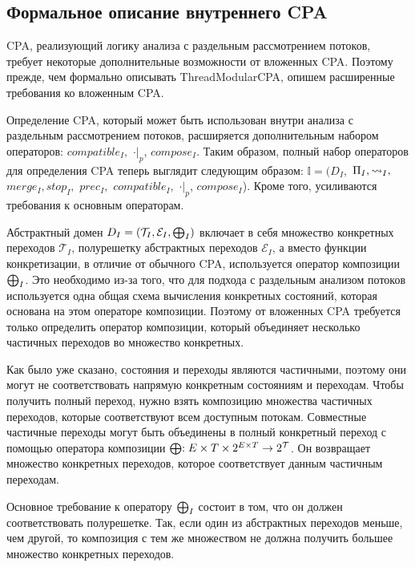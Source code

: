 \subsection{Формальное описание внутреннего CPA}
 
CPA, реализующий логику анализа с раздельным рассмотрением потоков, требует некоторые дополнительные возможности от вложенных CPA. 
Поэтому прежде, чем формально описывать ThreadModularCPA, опишем расширенные требования ко вложенным CPA.
 
Определение CPA, который может быть использован внутри анализа с раздельным рассмотрением потоков, расширяется дополнительным набором операторов: $compatible_{I},$ $\cdot|_p$, $compose_I$.
Таким образом, полный набор операторов для определения CPA теперь выглядит следующим образом: $\mathbb{I}=(D_{I},$ $\Pi_{I}, \leadsto_{I},$ $merge_{I}, stop_{I},$ $prec_{I},$ $compatible_{I},$ $\cdot|_p$, $compose_I$).
Кроме того, усиливаются требования к основным операторам.

Абстрактный домен $D_I = (\mathcal{T}_I, \mathcal{E}_I, \mathrel{\bigoplus}_I)$ включает в себя множество конкретных переходов $\mathcal{T}_I$, полурешетку абстрактных переходов $\mathcal{E}_I$, а вместо функции конкретизации, в отличие от обычного CPA, используется оператор композиции $\mathrel{\bigoplus}_I$.
Это необходимо из-за того, что для подхода с раздельным анализом потоков используется одна общая схема вычисления конкретных состояний, которая основана на этом операторе композиции. 
Поэтому от вложенных CPA требуется только определить оператор композиции, который объединяет несколько частичных переходов во множество конкретных.

Как было уже сказано, состояния и переходы являются частичными, поэтому они могут не соответствовать напрямую конкретным состояниям и переходам. Чтобы получить полный переход, нужно взять композицию множества частичных переходов, которые соответствуют всем доступным потокам. Совместные частичные переходы могут быть объединены в полный конкретный переход с помощью оператора композиции $\mathrel{\bigoplus}: E \times T \times 2^{E \times T} \to 2^{\mathcal{T}}$.
Он возвращает множество конкретных переходов, которое соответствует данным частичным переходам.

Основное требование к оператору $\mathrel{\bigoplus}_I$ состоит в том, что он должен соответствовать полурешетке. Так, если один из абстрактных переходов меньше, чем другой, то композиция с тем же множеством не должна получить большее множество конкретных переходов. 



